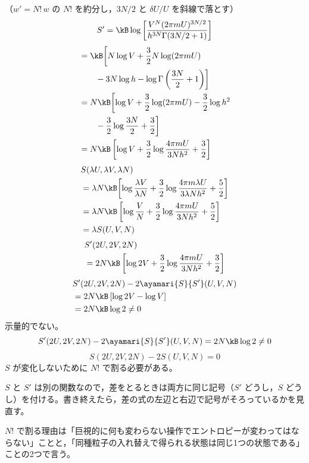 （$w'=N!\,w$ の $N!$ を約分し，$3N/2$ と $\delta U/U$ を斜線で落とす）
\[ S'=\kB\log\left[\frac{V^{N}(2\pi mU)^{3N/2}}{h^{3N}\Gamma(3N/2+1)}\right] \]
\begin{align*}
&=\kB\biggl[N\log V+\frac{3}{2}N\log(2\pi mU)\\
&\qquad-3N\log h-\log\Gamma\left(\frac{3N}{2}+1\right)\biggr]\\
&=N\kB\biggl[\log V+\frac{3}{2}\log(2\pi mU)-\frac{3}{2}\log h^{2}\\
&\qquad-\frac{3}{2}\log\frac{3N}{2}+\frac{3}{2}\biggr]\\
&=N\kB\left[\log V+\frac{3}{2}\log\frac{4\pi mU}{3Nh^{2}}+\frac{3}{2}\right]
\end{align*}
\begin{align*}
&S(\lambda U,\lambda V,\lambda N)\\
&=\lambda N\kB\biggl[\log\frac{\lambda V}{\lambda N}+\frac{3}{2}\log\frac{4\pi m\lambda U}{3\lambda Nh^{2}}+\frac{5}{2}\biggr]\\
&=\lambda N\kB\left[\log\frac{V}{N}+\frac{3}{2}\log\frac{4\pi mU}{3Nh^{2}}+\frac{5}{2}\right]\\
&=\lambda S(U,V,N)
\end{align*}
\begin{align*}
&S'(2U,2V,2N)\\
&=2N\kB\left[\log2V+\frac{3}{2}\log\frac{4\pi mU}{3Nh^{2}}+\frac{3}{2}\right]
\end{align*}
\begin{align*}
&S'(2U,2V,2N)-2\ayamari{S}{S'}(U,V,N)\\
&=2N\kB\left[\log2V-\log V\right]\\
&=2N\kB\log2\neq0
\end{align*}
示量的でない。
\[ S'(2U,2V,2N)-2\ayamari{S}{S'}(U,V,N)=2N\kB\log2\neq0 \]
\[ S(2U,2V,2N)-2S(U,V,N)=0 \]
$S$ が変化しないために $N!$ で割る必要がある。
\item $S$ と $S'$ は別の関数なので，差をとるときは両方に同じ記号（$S'$ どうし，$S$ どうし）を付ける。書き終えたら，差の式の左辺と右辺で記号がそろっているかを見直す。
\item $N!$ で割る理由は「巨視的に何も変わらない操作でエントロピーが変わってはならない」ことと，「同種粒子の入れ替えで得られる状態は同じ1つの状態である」ことの2つで言う。
